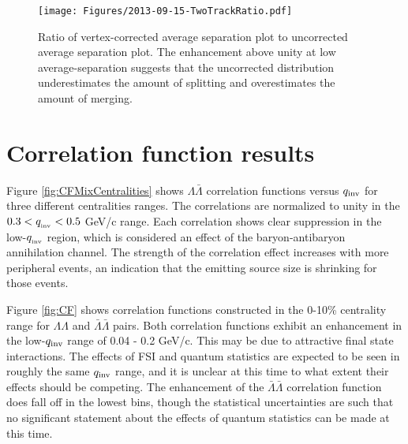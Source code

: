 \begin{figure}[hbtp]
\texttt{[image: Figures/2013-09-15-TwoTrackRatio.pdf]}
\caption[Ratio of corrected/uncorrected average-separation distributions]{Ratio of vertex-corrected average separation plot to uncorrected average separation plot.  The enhancement above unity at low average-separation suggests that the uncorrected distribution underestimates the amount of splitting and overestimates the amount of merging.}
\label{fig:TwoTrackRatio}
\end{figure}

\section{Correlation function results}
\label{sec:CFResults}



Figure \ref{fig:CFMixCentralities} shows $\Lambda\bar{\Lambda}$ correlation functions versus $q_{\rm inv}$ for three different centralities ranges.  The correlations are normalized to unity in the $ 0.3 < q_{\rm_{inv}} < 0.5$ GeV/c range.  Each correlation shows clear suppression in the low-$q_{\rm_{inv}}$ region, which is considered an effect of the baryon-antibaryon annihilation channel.  The strength of the correlation effect increases with more peripheral events, an indication that the emitting source size is shrinking for those events.

Figure \ref{fig:CF} shows correlation functions constructed in the 0-10\% centrality range for $\Lambda\Lambda$ and $\bar{\Lambda}\bar{\Lambda}$ pairs.  Both correlation functions exhibit an enhancement in the low-$q_{\rm inv}$ range of 0.04 - 0.2 GeV/c.  This may be due to attractive final state interactions.  The effects of FSI and quantum statistics are expected to be seen in roughly the same $q_{\rm inv}$ range, and it is unclear at this time to what extent their effects should be competing. The enhancement of the $\bar{\Lambda}\bar{\Lambda}$ correlation function does fall off in the lowest bins, though the statistical uncertainties are such that no significant statement about the effects of quantum statistics can be made at this time.



